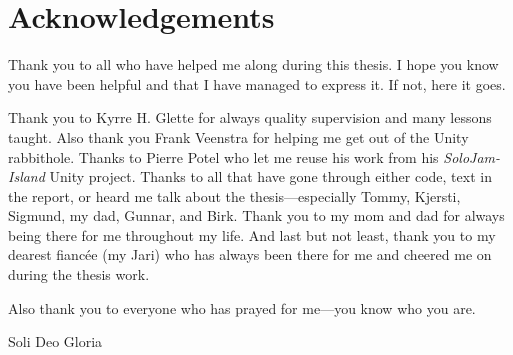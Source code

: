 \chapter*{Acknowledgements} %

Thank you to all who have helped me along during this thesis. I hope you know you have been helpful and that I have managed to express it. If not, here it goes.

Thank you to Kyrre H. Glette for always quality supervision and many lessons taught. Also thank you Frank Veenstra for helping me get out of the Unity rabbithole. Thanks to Pierre Potel who let me reuse his work from his \textit{SoloJam-Island} Unity project. Thanks to all that have gone through either code, text in the report, or heard me talk about the thesis—especially Tommy, Kjersti, Sigmund, my dad, Gunnar, and Birk. Thank you to my mom and dad for always being there for me throughout my life. And last but not least, thank you to my dearest fiancée (my Jari) who has always been there for me and cheered me on during the thesis work.

Also thank you to everyone who has prayed for me—you know who you are. \nl

{\huge \gothfamily Soli Deo Gloria}